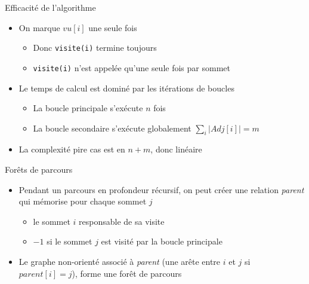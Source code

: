 \begin{frame}{Efficacité de l'algorithme}
    \begin{itemize}
        \item On marque $vu[i]$ une seule fois 
        \begin{itemize}
            \item Donc \texttt{visite(i)} termine toujours
            \item \texttt{visite(i)} n'est appelée qu'une seule fois par sommet
        \end{itemize}
        \item Le temps de calcul est dominé par les itérations de boucles
        \begin{itemize}
            \item La boucle principale s'exécute $n$ fois 
            \item La boucle secondaire s'exécute globalement $\sum_i | Adj[i] | = m$
        \end{itemize}
        \item La complexité pire cas est en $n+m$, donc linéaire
    \end{itemize}
\end{frame}

\begin{frame}{Forêts de parcours}
    \begin{itemize}
        \item Pendant un parcours en profondeur récursif, on peut créer une relation \emph{parent} qui mémorise pour chaque sommet $j$ 
        \begin{itemize}
            \item le sommet $i$ responsable de sa visite 
            \item $-1$ si le sommet $j$ est visité par la boucle principale 
        \end{itemize}
        \item Le graphe non-orienté associé à \emph{parent} (une arête entre $i$ et $j$ si $parent[i]=j$), forme une forêt de parcours 
    \end{itemize}
\end{frame}




